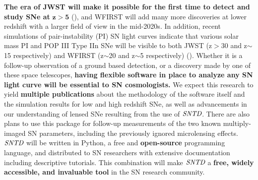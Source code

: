 


 \textbf{The era of JWST will make it possible for the first time to detect and study SNe 
 at} $\mathbf{z>5}$ (\cite{Mesinger:2006}), and WFIRST will add many more discoveries at lower redshift 
 with a larger field of view in the mid-2020s. 
In addition, recent simulations of pair-instability (PI) SN light curves indicate
that various solar mass PI and POP III Type IIn SNe will be visible to
both JWST (z$>$30 and z$\sim$15 respectively) and WFIRST (z$\sim$20
and z$\sim$5 respectively) (\cite{Magg:2016}). Whether it is a follow-up observation
of a ground based detection, or a discovery made by one of these space
telescopes, \textbf{having flexible software in place to analyze any SN light
curve will be essential to SN cosmologists.} We expect this research to
yield \textbf{multiple publications} about the methodology of the software
itself and the simulation results for low and high redshift SNe, as
well as advancements in our understanding of lensed SNe resulting from
the use of $\textit{SNTD}$. There are also plans to use this package
for follow-up measurements of the two known multiply-imaged SN
parameters, including the previously ignored microlensing
effects. $\textit{SNTD}$ will be written in Python, a free and
\textbf{open-source} programming language, and distributed to SN researchers
with extensive documentation including descriptive tutorials. This
combination will make $\textit{SNTD}$ a \textbf{free, widely accessible, and
invaluable tool} in the SN research community.  
